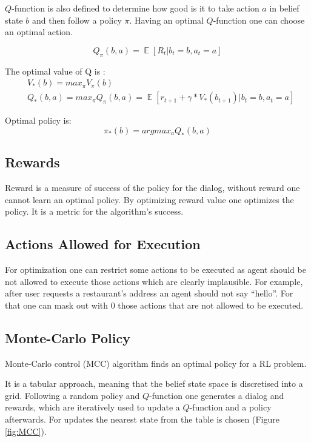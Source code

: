 \documentclass[12pt,titlepage,a4paper]{article}
\DeclareMathOperator*{\E}{\mathbb{E}}
\begin{document}
$Q$-function is also defined to determine how good is it to take action $a$ in belief state $b$ and then follow a policy $\pi$. Having an optimal $Q$-function one can choose an optimal action.

\begin{equation}
    Q_{\pi}(b, a) = \E[R_t| b_t = b, a_t = a]
\end{equation}

The optimal value of Q is \cite{Sutton1998}:
\begin{align}
    &V_{*}(b) = max_{\pi}V_{\pi}(b) \\
    &Q_{*}(b, a) = max_{\pi}Q_{\pi}(b, a) = \E[r_{t+1} + \gamma * V_{*}(b_{t+1})| b_t = b, a_t = a] 
\end{align}

Optimal policy is: 
\begin{equation}
    \pi_{*}(b) = argmax_{a} Q_{*}(b, a)
\end{equation}


\subsection{Rewards}
Reward is a measure of success of the policy for the dialog, without reward one cannot learn an optimal policy. By optimizing reward value one opti\-mizes the policy. It is a metric for the algorithm's success.

\subsection{Actions Allowed for Execution}

For optimization one can restrict some actions to be executed as agent should be not allowed to execute those actions which are clearly implausible. For example, after user requests a restaurant's address an agent should not say ``hello”. For that one can mask out with 0 those actions that are not allowed to be executed.

\subsection{Monte-Carlo Policy}

Monte-Carlo control (MCC) algorithm \cite{Sutton1998} finds an optimal policy for a RL problem.

It is a tabular approach, meaning that the belief state space is discretised into a grid. Following a random policy and $Q$-function one generates a dialog and rewards, which are iteratively used to update a $Q$-function and a policy afterwards. For updates the nearest state from the table is chosen (Figure \ref{fig:MCC}). 
\end{document}
